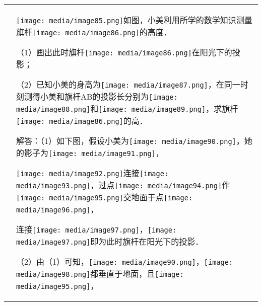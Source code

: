 \documentclass[a4paper,11pt,UTF8]{ctexart}
\begin{document}
\begin{longtable}[]{@{}ll@{}}
\toprule
\endhead
\begin{minipage}[t]{0.47\columnwidth}\raggedright
\strut
\end{minipage} & \begin{minipage}[t]{0.47\columnwidth}\raggedright
\texttt{[image: media/image85.png]}如图，小美利用所学的数学知识测量旗杆\texttt{[image: media/image86.png]}的高度．

（1）画出此时旗杆\texttt{[image: media/image86.png]}在阳光下的投影；

（2）已知小美的身高为\texttt{[image: media/image87.png]}，在同一时刻测得小美和旗杆AB的投影长分别为\texttt{[image: media/image88.png]}和\texttt{[image: media/image89.png]}，求旗杆\texttt{[image: media/image86.png]}的高．

解答：（1）如下图，假设小美为\texttt{[image: media/image90.png]}，她的影子为\texttt{[image: media/image91.png]}，

\texttt{[image: media/image92.png]}连接\texttt{[image: media/image93.png]}，过点\texttt{[image: media/image94.png]}作\texttt{[image: media/image95.png]}交地面于点\texttt{[image: media/image96.png]}，

连接\texttt{[image: media/image97.png]}，\texttt{[image: media/image97.png]}即为此时旗杆在阳光下的投影．

（2）由（1）可知，\texttt{[image: media/image90.png]}，\texttt{[image: media/image98.png]}都垂直于地面，且\texttt{[image: media/image95.png]}，


\end{minipage}
\end{longtable}
\end{document}
